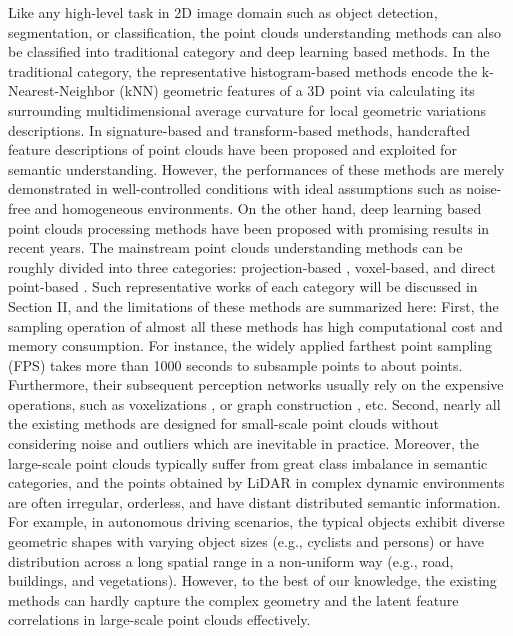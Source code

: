 \documentclass[journal]{IEEEtran}
\begin{document}
Like any high-level task in 2D image domain such as object detection, segmentation, or classification, the point clouds understanding methods can also be classified into traditional category and deep learning based methods. In the traditional category, the representative histogram-based methods \cite{rusu2008aligning} \cite{rusu2009fast} encode the k-Nearest-Neighbor (kNN) geometric features of a 3D point via calculating its surrounding multidimensional average curvature for local geometric variations descriptions. In signature-based \cite{tombari2010unique} and transform-based \cite{guo20143d} methods, handcrafted feature descriptions of point clouds have been proposed and exploited for semantic understanding. However, the performances of these methods are merely demonstrated in well-controlled conditions with ideal assumptions such as noise-free and homogeneous environments\cite{guo20143d}. On the other hand, deep learning based point clouds processing methods have been proposed with promising results in recent years. 
The mainstream point clouds understanding methods can be roughly divided into three categories: projection-based \cite{milioto2019rangenet++,wu2019squeezesegv2,xu2020squeezesegv3,feng2018gvcnn,kundu2020virtual,li2020end,gojcic2020learning}, voxel-based\cite{graham20183d,choy20194d,tang2020searching, meng2019vv,ye2020hvnet}, and direct point-based \cite{landrieu2019point,wang2019re,nezhadarya2020adaptive,zhang2019shellnet, qi2017pointnet++,yan2020pointasnl,liu2019densepoint,qi2017pointnet,shen2018mining,thomas2019kpconv,lei2020spherical, liu2019point, wu2019pointconv}. Such representative works of each category will be discussed in Section II, and the limitations of these methods are summarized here: First, the sampling operation of almost all these methods has high computational cost and memory consumption. For instance, the widely applied farthest point sampling (FPS) \cite{qi2017pointnet++} \cite{yan2020pointasnl} takes more than 1000 seconds to subsample  points to about  points. Furthermore, their subsequent perception networks usually rely on the expensive operations, such as voxelizations \cite{graham20183d} \cite{choy20194d}, or graph construction \cite{landrieu2019point}, etc. Second, nearly all the existing methods are designed for small-scale point clouds without considering noise and outliers which are inevitable in practice. Moreover, the large-scale point clouds typically suffer from great class imbalance in semantic categories, and the points obtained by LiDAR in complex dynamic environments are often irregular, orderless, and have distant distributed semantic information. For example, in autonomous driving scenarios, the typical objects exhibit diverse geometric shapes with varying object sizes (e.g., cyclists and persons) or have distribution across a long spatial range in a non-uniform way (e.g., road, buildings, and vegetations). However, to the best of our knowledge, the existing methods can hardly capture the complex geometry and the latent feature correlations in large-scale point clouds effectively.
\end{document}

